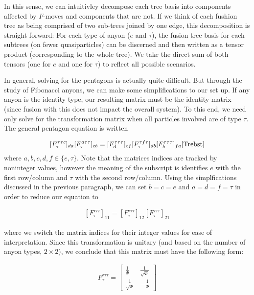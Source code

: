 \documentclass[10pt]{ucthesis}
\begin{document}
In this sense, we can intuitivley decompose each tree basis into components affected by $F$-moves and components that are not. If we think of each fushion tree as being comprised of two sub-trees joined by one edge, this decomposition is straight forward: For each type of anyon ($e$ and $\tau$), the fusion tree basis for each subtrees (on fewer quasiparticles) can be discerned and then written as a tensor product (corresponding to the whole tree). We take the direct sum of both tensors (one for $e$ and one for $\tau$) to reflect all possible scenarios.

In general, solving for the pentagons is actually quite difficult. But through the study of Fibonacci anyons, we can make some simplifications to our set up. If any anyon is the identity type, our resulting matrix must be the identity matrix (since fusion with this does not impact the overall system). To this end, we need only solve for the transformation matrix when all particles involved are of type $\tau$. The general pentagon equation is written

\begin{equation}
	\begin{aligned}
		[F^{\tau\tau c}_\tau]_{da}[F^{a\tau\tau}_\tau]_{cb} = [F^{\tau\tau \tau}_d]_{cf}[F^{\tau f\tau}_\tau]_{db}[F^{\tau\tau\tau}_b]_{fa}\cite{Trebst}
	\end{aligned}
\end{equation}
where $a,b,c,d,f\in\{e,\tau\}$. Note that the matrices indices are tracked by noninteger values, however the meaning of the subscript is identifies $e$ with the first row/column and $\tau$ with the second row/column. Using the simplfications discussed in the previous paragraph, we can set $b=c=e$ and $a=d=f=\tau$ in order to reduce our equation to 

\begin{equation}
	\begin{aligned}
		[F^{\tau\tau\tau}_\tau]_{11} = [F^{\tau\tau\tau}_\tau]_{12}[F^{\tau\tau\tau}_\tau]_{21}
	\end{aligned}
\end{equation}

where we switch the matrix indices for their integer values for ease of interpretation. Since this transformation is unitary (and based on the number of anyon types, $2\times 2$), we conclude that this matrix must have the following form:

\begin{equation}
	\begin{aligned}
		F^{\tau\tau\tau}_\tau = \begin{bmatrix}
									\frac{1}{\Phi} & \frac{1}{\sqrt{\Phi}}\\
									\frac{1}{\sqrt{\Phi}} & -\frac{1}{\Phi}
								\end{bmatrix}
	\end{aligned}
\end{equation}
\end{document}
